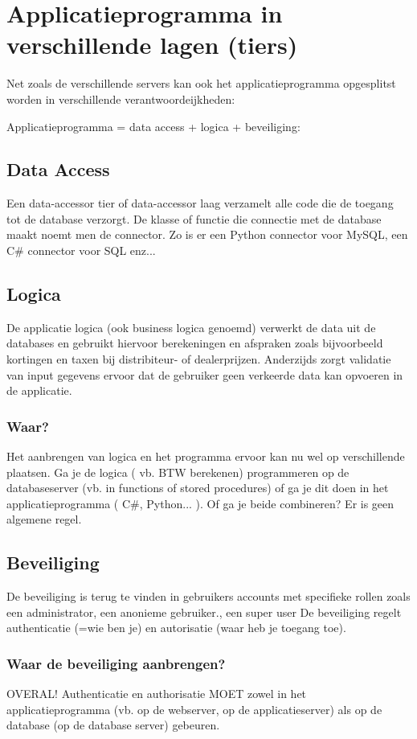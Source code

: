 \documentclass{article}
\begin{document}
\section{Applicatieprogramma in verschillende lagen (tiers)}
Net zoals de verschillende servers kan ook het applicatieprogramma opgesplitst worden in verschillende verantwoordeijkheden:

Applicatieprogramma = data access + logica + beveiliging:

\subsection{Data Access}
Een data-accessor tier of data-accessor laag verzamelt alle code die de toegang tot de database verzorgt. De
klasse of functie die connectie met de database maakt noemt men de connector. Zo is er een Python
connector voor MySQL, een C\# connector voor SQL enz...

\subsection{Logica}
De applicatie logica (ook business logica genoemd) verwerkt de data uit de databases en gebruikt hiervoor
berekeningen en afspraken zoals bijvoorbeeld kortingen en taxen bij distribiteur- of dealerprijzen.
Anderzijds zorgt validatie van input gegevens ervoor dat de gebruiker geen verkeerde data kan opvoeren
in de applicatie.

\subsubsection{Waar?}
Het aanbrengen van logica en het programma ervoor kan nu wel op verschillende plaatsen. Ga je de logica 
( vb. BTW berekenen) programmeren op de databaseserver (vb. in functions of stored procedures) of ga je 
dit doen in het applicatieprogramma ( C\#, Python... ). Of ga je beide combineren? Er is geen algemene 
regel.


\subsection{Beveiliging}
De beveiliging is terug te vinden in gebruikers accounts met specifieke rollen zoals een administrator, een
anonieme gebruiker., een super user De beveiliging regelt authenticatie (=wie ben je) en autorisatie (waar
heb je toegang toe).

\subsubsection{Waar de beveiliging aanbrengen?}
OVERAL! Authenticatie en authorisatie MOET zowel in het applicatieprogramma (vb. op de
webserver, op de applicatieserver) als op de database (op de database server) gebeuren.
\end{document}
